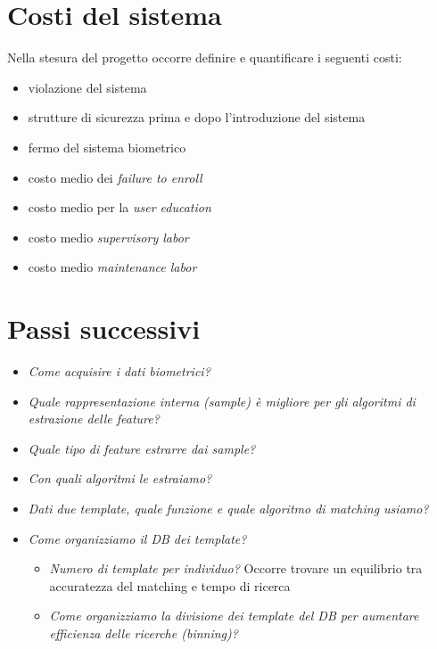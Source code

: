 \documentclass{report}
\begin{document}
\section{Costi del sistema}
Nella stesura del progetto occorre definire e quantificare i seguenti costi:
\begin{itemize}
    \item violazione del sistema 
    \item strutture di sicurezza prima e dopo l'introduzione del sistema 
    \item fermo del sistema biometrico 
    \item costo medio dei \textit{failure to enroll}
    \item costo medio per la \textit{user education}
    \item costo medio \textit{supervisory labor}
    \item costo medio \textit{maintenance labor}
\end{itemize}

\section{Passi successivi}
\begin{itemize}
    \item \textit{Come acquisire i dati biometrici?}
    \item \textit{Quale rappresentazione interna (sample) è migliore per gli algoritmi di estrazione delle feature?}
    \item \textit{Quale tipo di feature estrarre dai sample?}
    \item \textit{Con quali algoritmi le estraiamo?}
    \item \textit{Dati due template, quale funzione e quale algoritmo di matching usiamo?}
    \item \textit{Come organizziamo il DB dei template?}
    \begin{itemize}
        \item \textit{Numero di template per individuo?} Occorre trovare un equilibrio tra accuratezza del matching e tempo di ricerca 
        \item \textit{Come organizziamo la divisione dei template del DB per aumentare efficienza delle 
        ricerche (binning)?} 
    \end{itemize}
\end{itemize}
\end{document}
